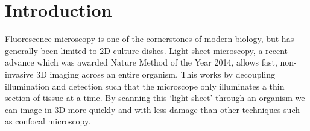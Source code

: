 
\ifpdf
    \graphicspath{{Chapters/intro/Figs/Raster/}{Chapters/intro/Figs/PDF/}{Chapters/intro/Figs/}}
\else
    \graphicspath{{Chapters/intro/Figs/Vector/}{Chapters/intro/Figs/}}
\fi

\chapter{Introduction}

Fluorescence microscopy is one of the cornerstones of modern biology, but has generally been limited to 2D culture dishes.
Light-sheet microscopy, a recent advance which was awarded Nature Method of the Year 2014, allows fast, non-invasive 3D imaging across an entire organism.
This works by decoupling illumination and detection such that the microscope only illuminates a thin section of tissue at a time.
By scanning this `light-sheet' through an organism we can image in 3D more quickly and with less damage than other techniques such as confocal microscopy.


